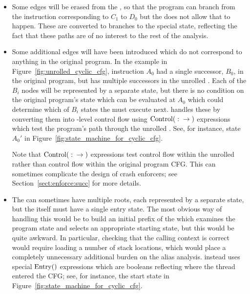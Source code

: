 \begin{itemize}
\item
  Some edges will be erased from the , so that the
  program can branch from the instruction corresponding to $C_1$ to
  $D_0$ but the  does not allow that to happen.  These
  are converted to branches to the special  state,
  reflecting the fact that these paths are of no interest to the rest
  of the analysis.

\item
  Some additional edges will have been introduced which do not
  correspond to anything in the original program.  In the example in
  Figure~\ref{fig:unrolled_cyclic_cfg}, instruction $A_0$ had a single
  successor, $B_0$, in the original program, but has multiple
  successors in the unrolled .  Each of the $B_i$
   nodes will be represented by a separate
          {\StateMachine} state, but there is no condition on the
          original program's state which can be evaluated at $A_0$
          which could determine which of $B_i$ states the
          {\StateMachine} must execute next.  {\Technique} handles
          these by converting them into \StateMachine-level control
          flow using $\mathrm{Control}(\mathrm{}:\mathrm{} \rightarrow \mathrm{})$ expressions which test the
          program's path through the unrolled .  See, for
          instance, state $A_0'$ in
          Figure~\ref{fig:state_machine_for_cyclic_cfg}.

  Note that $\mathrm{Control}(\mathrm{}:\mathrm{} \rightarrow \mathrm{})$ expressions test control flow within
  the unrolled  rather than control flow within the
  original program CFG.  This can sometimes complicate the design of
  crash enforcers; see Section~\ref{sect:enforce:succ} for more
  details.

\item
  The  can sometimes have multiple roots, each
  represented by a separate {\StateMachine} state, but the
  {\StateMachine} itself must have a single entry state.  The most
  obvious way of handling this would be to build an initial prefix of
  the {\StateMachine} which examines the program state and selects an
  appropriate starting state, but this would be quite awkward.  In
  particular, checking that the calling context is correct would
  require loading a number of stack locations, which would place a
  completely unnecessary additional burden on the alias analysis.
  {\Technique} instead uses special $\mathrm{Entry}()$ expressions which
  are booleans reflecting where the thread entered the CFG; see, for
  instance, the start state in
  Figure~\ref{fig:state_machine_for_cyclic_cfg}.

\end{itemize}

